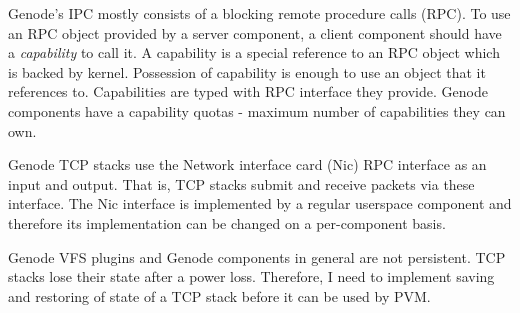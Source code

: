 Genode's IPC mostly consists of a blocking remote procedure calls (RPC). To use
an RPC object provided by a server component, a client component should have a
\textit{capability} to call it. A capability is a special reference to an RPC
object which is backed by kernel. Possession of capability is enough to use an
object that it references to. Capabilities are typed with RPC interface they
provide. Genode components have a capability quotas - maximum number of
capabilities they can own.

Genode TCP stacks use the Network interface card (Nic) RPC interface as an
input and output. That is, TCP stacks submit and receive packets via these
interface. The Nic interface is implemented by a regular userspace component
and therefore its implementation can be changed on a per-component basis.

Genode VFS plugins and Genode components in general are not persistent. TCP
stacks lose their state after a power loss. Therefore, I need to implement
saving and restoring of state of a TCP stack before it can be used by PVM.

